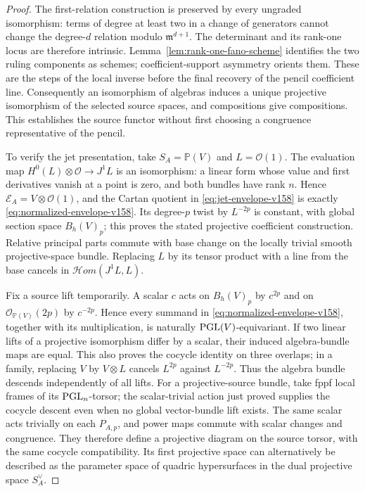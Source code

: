 \documentclass[11pt,reqno]{amsart}
\numberwithin{equation}{section}
\theoremstyle{definition}\newtheorem{definition}[theorem]{Definition}
\theoremstyle{remark}\newtheorem{remark}[theorem]{Remark}
\newcommand{\Pj}{\mathbb P}\newcommand{\A}{\mathbb A}
\newcommand{\OO}{\mathcal O}\newcommand{\II}{\mathcal I}
\begin{document}
\begin{proof}
The first-relation construction is preserved by every ungraded
isomorphism: terms of degree at least two in a change of generators
cannot change the degree-$d$ relation modulo $\mathfrak m^{d+1}$.
The determinant and its rank-one locus are therefore intrinsic.
Lemma~\ref{lem:rank-one-fano-scheme} identifies the two ruling
components as schemes; coefficient-support asymmetry orients them.
These are the steps of the local inverse before the final recovery
of the pencil coefficient line. Consequently an isomorphism of
algebras induces a unique projective isomorphism of the selected
source spaces, and compositions give compositions. This establishes
the source functor without first choosing a congruence representative
of the pencil.

To verify the jet presentation, take $S_A=\Pj(V)$ and $L=\OO(1)$.
The evaluation map $H^0(L)\otimes\OO\to J^1L$ is an isomorphism:
a linear form whose value and first derivatives vanish at a point is
zero, and both bundles have rank $n$. Hence
$\mathscr E_A=V\otimes\OO(1)$, and the Cartan quotient in
\eqref{eq:jet-envelope-v158} is exactly
\eqref{eq:normalized-envelope-v158}. Its degree-$p$ twist by
$L^{-2p}$ is constant, with global section space $B_h(V)_p$;
this proves the stated projective coefficient construction. Relative
principal parts commute with base change on the locally trivial smooth
projective-space bundle. Replacing $L$ by its tensor product with a
line from the base cancels in $\mathcal Hom(J^1L,L)$.

Fix a source lift temporarily. A scalar $c$ acts on $B_h(V)_p$ by
$c^{2p}$ and on $\OO_{\Pj(V)}(2p)$ by $c^{-2p}$. Hence every summand
in \eqref{eq:normalized-envelope-v158}, together with its multiplication,
is naturally $\operatorname{PGL}(V)$-equivariant. If two linear lifts of a projective
isomorphism differ by a scalar, their induced algebra-bundle maps
are equal. This also proves the cocycle identity on three overlaps;
in a family, replacing $V$ by $V\otimes L$ cancels $L^{2p}$ against
$L^{-2p}$. Thus the algebra bundle descends independently of all
lifts. For a projective-source bundle, take fppf local frames of its
$\operatorname{PGL}_n$-torsor; the scalar-trivial action just proved supplies the
cocycle descent even when no global vector-bundle lift exists. The same scalar acts trivially on each $P_{A,p}$, and power
maps commute with scalar changes and congruence. They therefore
define a projective diagram on the source torsor, with the same
cocycle compatibility. Its first projective space can alternatively
be described as the parameter space of quadric hypersurfaces in the
dual projective space $S_A^\vee$.


\end{proof}
\end{document}
